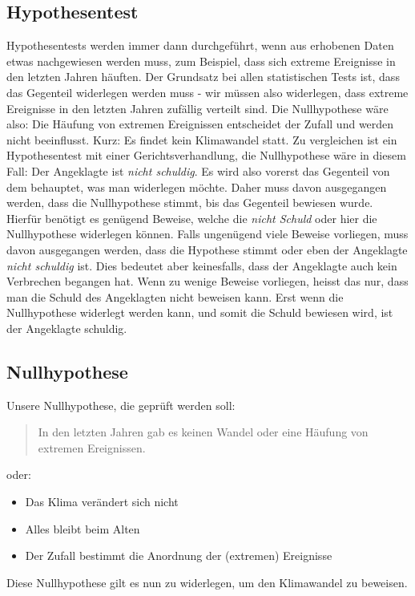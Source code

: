 \begin{refsection}
\section{Hypothesentest}
Hypothesentests werden immer dann durchgeführt, wenn aus erhobenen Daten etwas nachgewiesen werden muss, zum Beispiel, dass sich extreme Ereignisse in den letzten Jahren häuften. Der Grundsatz bei allen statistischen Tests ist, dass das Gegenteil widerlegen werden muss - wir müssen also widerlegen, dass extreme Ereignisse in den letzten Jahren zufällig verteilt sind. Die Nullhypothese wäre also: Die Häufung von extremen Ereignissen entscheidet der Zufall und werden nicht beeinflusst. Kurz: Es findet kein Klimawandel statt.
Zu vergleichen ist ein Hypothesentest mit einer Gerichtsverhandlung, die Nullhypothese wäre in diesem Fall: Der Angeklagte ist {\em nicht schuldig}. Es wird also vorerst das Gegenteil von dem behauptet, was man widerlegen möchte. Daher muss davon ausgegangen werden, dass die Nullhypothese stimmt, bis das Gegenteil bewiesen wurde. Hierfür benötigt es genügend Beweise, welche die {\em nicht Schuld} oder hier die Nullhypothese widerlegen können.
Falls ungenügend viele Beweise vorliegen, muss davon ausgegangen werden, dass die Hypothese stimmt oder eben der Angeklagte {\em nicht schuldig} ist. Dies bedeutet aber keinesfalls, dass der Angeklagte auch kein Verbrechen begangen hat. Wenn zu wenige Beweise vorliegen, heisst das nur, dass man die Schuld des Angeklagten nicht beweisen kann. Erst wenn die Nullhypothese widerlegt werden kann, und somit die Schuld bewiesen wird, ist der Angeklagte schuldig.


\subsection{Nullhypothese}
Unsere Nullhypothese, die geprüft werden soll:

\begin{quote}
In den letzten Jahren gab es keinen Wandel oder eine Häufung von extremen Ereignissen.
\end{quote}
oder:
\begin{itemize}
\item Das Klima verändert sich nicht
\item Alles bleibt beim Alten
\item Der Zufall bestimmt die Anordnung der (extremen) Ereignisse
\end{itemize}
%
Diese Nullhypothese gilt es nun zu widerlegen, um den Klimawandel zu beweisen.



\end{refsection}
